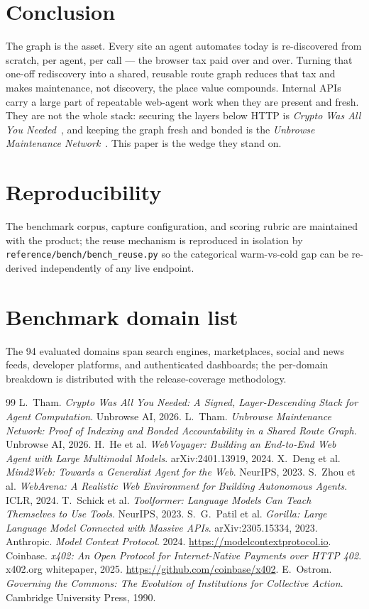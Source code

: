 \documentclass[11pt]{article}
\begin{document}
\section{Conclusion}
The graph is the asset. Every site an agent automates today is re-discovered from
scratch, per agent, per call --- the browser tax paid over and over. Turning that
one-off rediscovery into a shared, reusable route graph reduces that tax and makes
maintenance, not discovery, the place value compounds. Internal APIs carry a large
part of repeatable web-agent work when they are present and fresh. They are not
the whole stack: securing the layers below HTTP is \emph{Crypto Was All You
Needed}~\cite{security}, and keeping the graph fresh and bonded is the
\emph{Unbrowse Maintenance Network}~\cite{maintenance}. This paper is the wedge they
stand on.

\appendix
\section{Reproducibility}
The benchmark corpus, capture configuration, and scoring rubric are maintained with
the product; the reuse mechanism is reproduced in isolation by
\texttt{reference/bench/bench\_reuse.py} so the categorical
warm-vs-cold gap can be re-derived independently of any live endpoint.

\section{Benchmark domain list}
The 94 evaluated domains span search engines, marketplaces, social and news feeds,
developer platforms, and authenticated dashboards; the per-domain breakdown is
distributed with the release-coverage methodology.

\begin{thebibliography}{99}
 L.~Tham. \emph{Crypto Was All You Needed: A Signed,
Layer-Descending Stack for Agent Computation}. Unbrowse AI, 2026.
 L.~Tham. \emph{Unbrowse Maintenance Network: Proof of
Indexing and Bonded Accountability in a Shared Route Graph}. Unbrowse AI, 2026.
 H.~He et al. \emph{WebVoyager: Building an End-to-End Web Agent
with Large Multimodal Models}. arXiv:2401.13919, 2024.
 X.~Deng et al. \emph{Mind2Web: Towards a Generalist Agent for the
Web}. NeurIPS, 2023.
 S.~Zhou et al. \emph{WebArena: A Realistic Web Environment for
Building Autonomous Agents}. ICLR, 2024.
 T.~Schick et al. \emph{Toolformer: Language Models Can Teach
Themselves to Use Tools}. NeurIPS, 2023.
 S.~G.~Patil et al. \emph{Gorilla: Large Language Model Connected
with Massive APIs}. arXiv:2305.15334, 2023.
 Anthropic. \emph{Model Context Protocol}. 2024.
\url{https://modelcontextprotocol.io}.
 Coinbase. \emph{x402: An Open Protocol for Internet-Native Payments
over HTTP 402}. x402.org whitepaper, 2025. \url{https://github.com/coinbase/x402}.
 E.~Ostrom. \emph{Governing the Commons: The Evolution of
Institutions for Collective Action}. Cambridge University Press, 1990.
\end{thebibliography}
\end{document}
